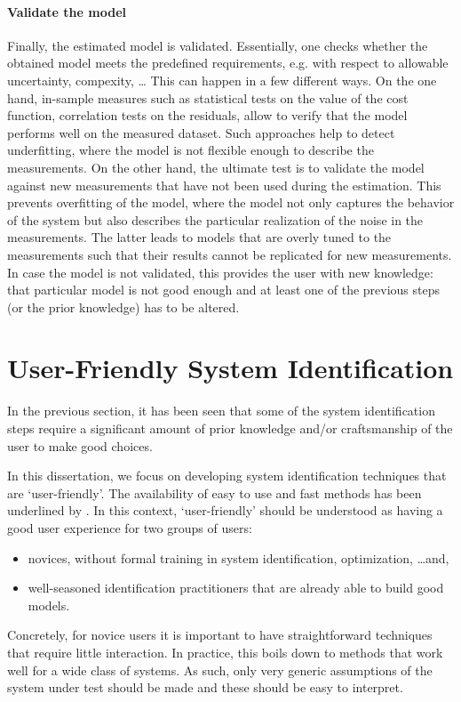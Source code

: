 \paragraph{Validate the model}
Finally, the estimated model is validated.
Essentially, one checks whether the obtained model meets the predefined requirements, e.g. with respect to allowable uncertainty, compexity, \ldots
This can happen in a few different ways.
On the one hand, in-sample measures such as statistical tests on the value of the cost function, correlation tests on the residuals,  allow to verify that the model performs well on the measured dataset.
Such approaches help to detect underfitting, where the model is not flexible enough to describe the measurements.
On the other hand, the ultimate test is to validate the model against new measurements that have not been used during the estimation.
This prevents overfitting of the model, where the model not only captures the behavior of the system but also describes the particular realization of the noise in the measurements.
The latter leads to models that are overly tuned to the measurements such that their results cannot be replicated for new measurements.
In case the model is not validated, this provides the user with new knowledge: that particular model is not good enough and at least one of the previous steps (or the prior knowledge) has to be altered.

\section{User-Friendly System Identification}
In the previous section, it has been seen that some of the system identification steps require a significant amount of prior knowledge and/or craftsmanship of the user to make good choices.

In this dissertation, we focus on developing system identification techniques that are `user-friendly'.
The availability of easy to use and fast methods has been underlined by \citet{Gevers2011Challenges}.
In this context, `user-friendly' should be understood as having a good user experience for two groups of users:
\begin{itemize}
  \item novices, without formal training in system identification, optimization, \ldots and,
  \item well-seasoned identification practitioners that are already able to build good models.
\end{itemize}
Concretely, for novice users it is important to have straightforward techniques that require little interaction.
In practice, this boils down to methods that work well for a wide class of systems.
As such, only very generic assumptions of the system under test should be made and these should be easy to interpret.

